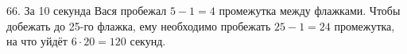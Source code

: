 66. За 10 секунда Вася пробежал $5-1=4$ промежутка между флажками. Чтобы добежать до 25-го флажка, ему необходимо пробежать $25-1=24$ промежутка, на что уйдёт $6\cdot20=120$ секунд.\\
